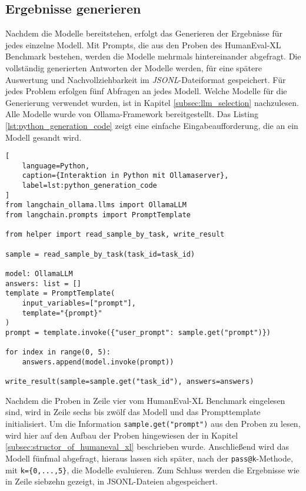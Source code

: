 \subsection{Ergebnisse generieren}
Nachdem die Modelle bereitstehen, erfolgt das Generieren der Ergebnisse für jedes einzelne Modell. Mit Prompts, die aus den Proben des HumanEval-XL Benchmark bestehen, werden die Modelle mehrmals hintereinander abgefragt. Die vollständig generierten Antworten der Modelle werden, für eine spätere Auswertung und Nachvollziehbarkeit im \textit{JSONL}-Dateiformat gespeichert. Für jedes Problem erfolgen fünf Abfragen an jedes Modell. Welche Modelle für die Generierung verwendet wurden, ist in Kapitel \ref{subsec:llm_selection} nachzulesen. Alle Modelle wurde von Ollama-Framework bereitgestellt. Das Listing \ref{lst:python_generation_code} zeigt eine einfache Eingabeaufforderung, die an ein Modell gesandt wird.\vspace{0.2cm}

\begin{lstlisting}[
	language=Python,
	caption={Interaktion in Python mit Ollamaserver},
	label=lst:python_generation_code
]
from langchain_ollama.llms import OllamaLLM
from langchain.prompts import PromptTemplate

from helper import read_sample_by_task, write_result

sample = read_sample_by_task(task_id=task_id)

model: OllamaLLM
answers: list = []
template = PromptTemplate(
    input_variables=["prompt"],
    template="{prompt}"
)
prompt = template.invoke({"user_prompt": sample.get("prompt")})

for index in range(0, 5):
    answers.append(model.invoke(prompt))

write_result(sample=sample.get("task_id"), answers=answers)
\end{lstlisting}

Nachdem die Proben in Zeile vier vom HumanEval-XL Benchmark eingelesen sind, wird in Zeile sechs bis zwölf das Modell und das Prompttemplate initialisiert. Um die Information \texttt{sample.get("prompt")} aus den Proben zu lesen, wird hier auf den Aufbau der Proben hingewiesen der in Kapitel \ref{subsec:structor_of_humaneval_xl} beschrieben wurde. Anschließend wird das Modell fünfmal abgefragt, hieraus lassen sich später, nach der \texttt{pass@k}-Methode, mit \texttt{k=\{0,...,5\}}, die Modelle evaluieren. Zum Schluss werden die Ergebnisse wie in Zeile siebzehn gezeigt, in JSONL-Dateien abgespeichert.

